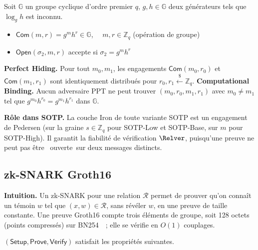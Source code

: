 \begin{sloppypar}
\begin{definition}\label{def:ann_pedersen}
Soit $\mathbb{G}$ un groupe cyclique d'ordre premier $q$,
$g, h \in \mathbb{G}$ deux générateurs tels que $\log_g h$ est inconnu.
\begin{itemize}
\item $\mathsf{Com}(m, r) = g^m h^r \in \mathbb{G}$, $\quad m,r \in \mathbb{Z}_q$ (op\'eration de groupe)
\item $\mathsf{Open}(\sigma_2, m, r)$ accepte si $\sigma_2 = g^m h^r$
\end{itemize}
\textbf{Perfect Hiding.} Pour tout $m_0, m_1$, les engagements
$\mathsf{Com}(m_0, r_0)$ et $\mathsf{Com}(m_1, r_1)$ sont identiquement
distribués pour $r_0, r_1 \xleftarrow{\$} \mathbb{Z}_q$.
\textbf{Computational Binding.} Aucun adversaire PPT ne peut trouver
$(m_0, r_0, m_1, r_1)$ avec $m_0 \neq m_1$ tel que
$g^{m_0} h^{r_0} = g^{m_1} h^{r_1}$ dans $\mathbb{G}$.
\end{definition}

\noindent\textbf{R\^ole dans SOTP.} La couche Iron de toute variante SOTP
est un engagement de Pedersen (sur la graine $s \in \mathbb{Z}_q$ pour SOTP-Low et
SOTP-Base, sur $m$ pour SOTP-High). Il garantit la fiabilit\'e de v\'erification
$\Relver$, puisqu'une preuve ne peut pas \^etre \guillemotleft~ouverte~\guillemotright sur deux messages
distincts.

\subsection{zk-SNARK Groth16}

\noindent\textbf{Intuition.} Un zk-SNARK pour une relation $\mathcal{R}$
permet de prouver qu'on conna\^it un t\'emoin $w$ tel que $(x,w) \in
\mathcal{R}$, sans r\'ev\'eler $w$, en une preuve de taille constante.
Une preuve Groth16 compte trois \'el\'ements de groupe, soit 128 octets (points compress\'es) sur
BN254~\cite{BarretoNaehrig2006}~; elle se v\'erifie en $O(1)$ couplages.

\begin{definition}\label{def:ann_groth16}
$(\mathsf{Setup}, \mathsf{Prove}, \mathsf{Verify})$ satisfait les propri\'et\'es suivantes.


\end{definition}
\end{sloppypar}
